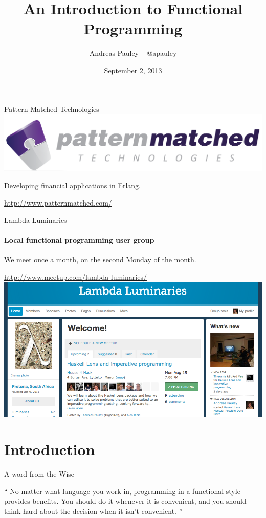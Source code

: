 \documentclass{beamer}
\title[Functional Programming]{An Introduction to Functional Programming}
\author{Andreas Pauley -- @apauley}
\institute{Pattern Matched Technologies\\Lambda Luminaries}
\date{September 2, 2013}
\begin{document}
\begin{frame}
\titlepage
\end{frame}

\begin{frame}{Pattern Matched Technologies}
\includegraphics[scale=0.21]{img/pmt-logo.png}

Developing financial applications in Erlang.

\url{http://www.patternmatched.com/}
\end{frame}

\begin{frame}{Lambda Luminaries}
\framesubtitle{Local functional programming user group}
We meet once a month, on the second Monday of the month.

\url{http://www.meetup.com/lambda-luminaries/}
\includegraphics[scale=0.3]{img/LambdaLuminariesScreenShot2013-08-09.png}

\end{frame}

\section{Introduction}

\begin{frame}{A word from the Wise}
  \begin{exampleblock}{}
    {\large ``
      No matter what language you work in, programming
      in a functional style provides benefits.
      You should do it whenever it is convenient, and you
      should think hard about the decision when it isn’t convenient.
      ''}
    \vskip5mm
    \hspace*{}
  \end{exampleblock}
\end{frame}
\end{document}
